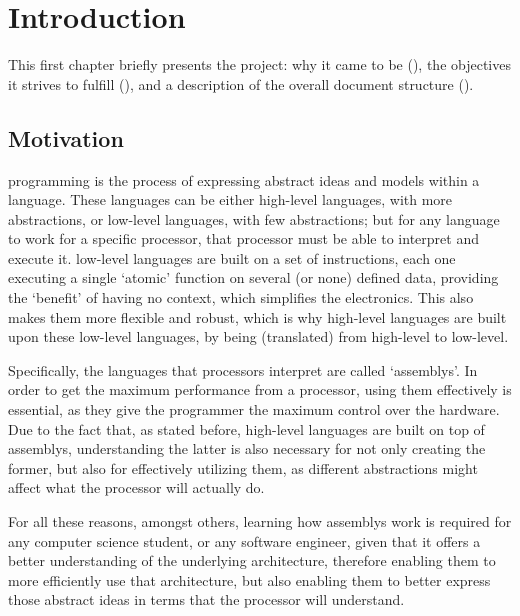 \chapter{Introduction}\label{chap:introduction}
This first chapter briefly presents the project: why it came to be (), the objectives it strives to fulfill (), and a description of the overall document structure ().


\section{Motivation}\label{sec:motivation}
\Gls{programming} is the process of expressing abstract ideas and models within a language. These languages can be either \glspl{high-level language}, with more abstractions, or \glspl{low-level language}, with few abstractions; but for any language to work for a specific \gls{processor}, that \gls{processor} must be able to interpret and execute it. \Glspl{low-level language} are built on a set of instructions, each one executing a single `atomic' function on several (or none) defined data, providing the `benefit' of having no context, which simplifies the electronics. This also makes them more flexible and robust, which is why \glspl{high-level language} are built upon these \glspl{low-level language}, by being  (translated) from high-level to low-level.

Specifically, the languages that processors interpret  are called `\glspl{assembly}'. In order to get the maximum performance from a \gls{processor}, using them effectively is essential, as they give the \gls{programmer} the maximum control over the hardware. Due to the fact that, as stated before, \glspl{high-level language} are built on top of \glspl{assembly}, understanding the latter is also necessary for not only creating the former, but also for effectively utilizing them, as different abstractions might affect what the \gls{processor} will actually do.

For all these reasons, amongst others, learning how \glspl{assembly} work is required for any \gls{computer science} student, or any \gls{software engineer}, given that it offers a better understanding of the underlying architecture, therefore enabling them to more efficiently use that architecture, but also enabling them to better express those abstract ideas in terms that the \gls{processor} will understand.

